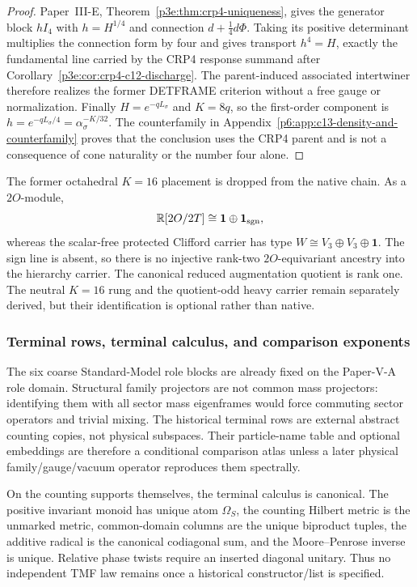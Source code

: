 \documentclass[11pt,a4paper]{article}
\begin{document}
\begin{proof}
Paper~III-E,
Theorem~\ref{p3e:thm:crp4-uniqueness}, gives the generator block
$hI_4$ with $h=H^{1/4}$ and connection $d+\tfrac14d\Phi$.
Taking its positive determinant multiplies the connection form by four and
gives transport $h^4=H$, exactly the fundamental line carried by the CRP4
response summand after
Corollary~\ref{p3e:cor:crp4-c12-discharge}.  The parent-induced associated
intertwiner therefore realizes the former DETFRAME criterion without a free
gauge or normalization.  Finally $H=e^{-qL_\sigma}$ and $K=8q$, so the
first-order component is
$h=e^{-qL_\sigma/4}=\alpha_\sigma^{-K/32}$.
The counterfamily in
Appendix~\ref{p6:app:c13-density-and-counterfamily} proves that the conclusion
uses the CRP4 parent and is not a consequence of cone naturality or the number
four alone.
\end{proof}

The former octahedral $K=16$ placement is dropped from the native chain.  As a
$2O$-module,
\[
 \mathbb R[2O/2T]\cong\mathbf1\oplus\mathbf1_{\rm sgn},
\]
whereas the scalar-free protected Clifford carrier has type
$W\cong V_3\oplus V_3\oplus\mathbf1$.  The sign line is absent, so there is no
injective rank-two $2O$-equivariant ancestry into the hierarchy carrier.  The
canonical reduced augmentation quotient is rank one.  The neutral $K=16$ rung
and the quotient-odd heavy carrier remain separately derived, but their
identification is optional rather than native.

\subsubsection{Terminal rows, terminal calculus, and comparison exponents}
The six coarse Standard-Model role blocks are already fixed on the Paper-V-A
role domain.  Structural family projectors are not common mass projectors:
identifying them with all sector mass eigenframes would force commuting sector
operators and trivial mixing.  The historical terminal rows are external
abstract counting copies, not physical subspaces.  Their particle-name table
and optional embeddings are therefore a conditional comparison atlas unless a
later physical family/gauge/vacuum operator reproduces them spectrally.

On the counting supports themselves, the terminal calculus is canonical.  The
positive invariant monoid has unique atom $\Omega_S$, the counting Hilbert
metric is the unmarked metric, common-domain columns are the unique biproduct
tuples, the additive radical is the canonical codiagonal sum, and the
Moore--Penrose inverse is unique.  Relative phase twists require an inserted
diagonal unitary.  Thus no independent TMF law remains once a historical
constructor/list is specified.
\end{document}
